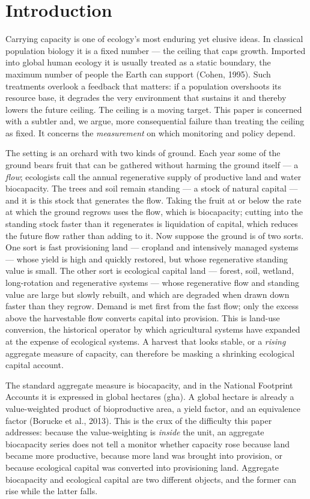 \documentclass[11pt]{article}
\begin{document}
\section{Introduction}

Carrying capacity is one of ecology's most enduring yet elusive ideas. In classical population biology it is a fixed number --- the ceiling that caps growth. Imported into global human ecology it is usually treated as a static boundary, the maximum number of people the Earth can support (Cohen, 1995). Such treatments overlook a feedback that matters: if a population overshoots its resource base, it degrades the very environment that sustains it and thereby lowers the future ceiling. The ceiling is a moving target. This paper is concerned with a subtler and, we argue, more consequential failure than treating the ceiling as fixed. It concerns the \emph{measurement} on which monitoring and policy depend.

The setting is an orchard with two kinds of ground. Each year some of the ground bears fruit that can be gathered without harming the ground itself --- a \emph{flow}; ecologists call the annual regenerative supply of productive land and water biocapacity. The trees and soil remain standing --- a stock of natural capital --- and it is this stock that generates the flow. Taking the fruit at or below the rate at which the ground regrows uses the flow, which is biocapacity; cutting into the standing stock faster than it regenerates is liquidation of capital, which reduces the future flow rather than adding to it. Now suppose the ground is of two sorts. One sort is fast provisioning land --- cropland and intensively managed systems --- whose yield is high and quickly restored, but whose regenerative standing value is small. The other sort is ecological capital land --- forest, soil, wetland, long-rotation and regenerative systems --- whose regenerative flow and standing value are large but slowly rebuilt, and which are degraded when drawn down faster than they regrow. Demand is met first from the fast flow; only the excess above the harvestable flow converts capital into provision. This is land-use conversion, the historical operator by which agricultural systems have expanded at the expense of ecological systems. A harvest that looks stable, or a \emph{rising} aggregate measure of capacity, can therefore be masking a shrinking ecological capital account.

The standard aggregate measure is biocapacity, and in the National Footprint Accounts it is expressed in global hectares (gha). A global hectare is already a value-weighted product of bioproductive area, a yield factor, and an equivalence factor (Borucke et al., 2013). This is the crux of the difficulty this paper addresses: because the value-weighting is \emph{inside} the unit, an aggregate biocapacity series does not tell a monitor whether capacity rose because land became more productive, because more land was brought into provision, or because ecological capital was converted into provisioning land. Aggregate biocapacity and ecological capital are two different objects, and the former can rise while the latter falls.
\end{document}
